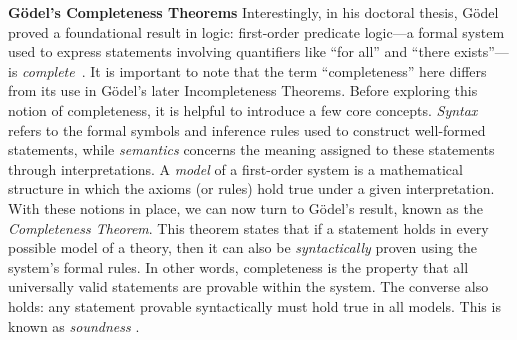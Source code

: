 \noindent \textbf{ Gödel’s Completeness Theorems} 
Interestingly, in his doctoral thesis, Gödel proved a foundational result in logic: first-order predicate logic---a formal system used to express statements involving quantifiers like ``for all'' and ``there exists''---is \emph{complete}~\cite{godelVollstandigkeitAxiomeLogischen1930}. It is important to note that the term ``completeness'' here differs from its use in Gödel’s later Incompleteness Theorems.
Before exploring this notion of completeness, it is helpful to introduce a few core concepts. \emph{Syntax} refers to the formal symbols and inference rules used to construct well-formed statements, while \emph{semantics} concerns the meaning assigned to these statements through interpretations. A \emph{model} of a first-order system is a mathematical structure in which the axioms (or rules) hold true under a given interpretation.
With these notions in place, we can now turn to Gödel’s result, known as the \emph{Completeness Theorem}. This theorem states that  if a statement holds in every possible model of a theory, then it can also be \emph{syntactically} proven using the system’s formal rules. In other words, completeness is the property that all universally valid statements are provable within the system.  The converse also holds: any statement provable syntactically must hold true in all models. This is known as \emph{soundness} \cite{franzenGodelsTheorem2008}.
 









